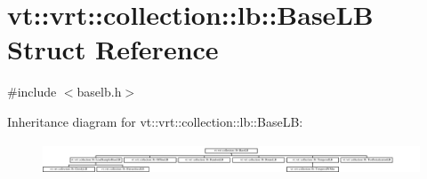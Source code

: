 \hypertarget{structvt_1_1vrt_1_1collection_1_1lb_1_1_base_l_b}{}\section{vt\+:\+:vrt\+:\+:collection\+:\+:lb\+:\+:Base\+LB Struct Reference}
\label{structvt_1_1vrt_1_1collection_1_1lb_1_1_base_l_b}


{\ttfamily \#include $<$baselb.\+h$>$}

Inheritance diagram for vt\+:\+:vrt\+:\+:collection\+:\+:lb\+:\+:Base\+LB\+:\begin{figure}[H]
\begin{center}
\leavevmode
\includegraphics[height=0.960000cm]{structvt_1_1vrt_1_1collection_1_1lb_1_1_base_l_b}
\end{center}
\end{figure}
